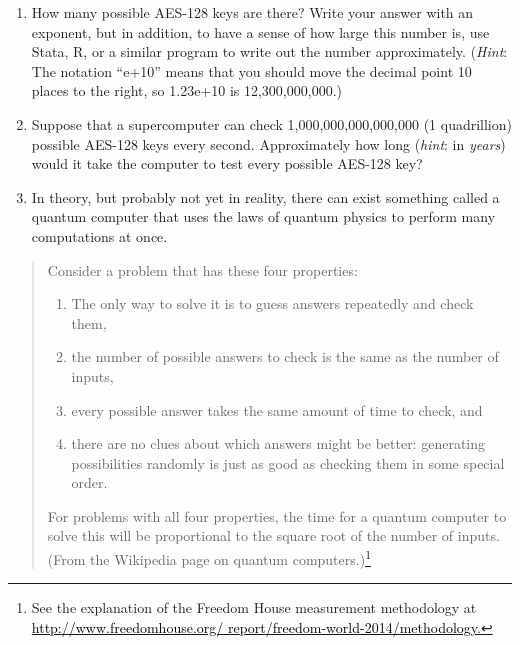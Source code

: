 \begin{enumerate}
\setlength\itemsep{3pt}
\item[(a)] How many possible AES-128 keys are there? Write your answer with an exponent, but in addition, to have a sense of how large this number is, use Stata, R, or a similar program to write out the number approximately. (\textit{Hint}: The notation ``e+10'' means that you should move the decimal point 10 places to the right, so 1.23e+10 is 12,300,000,000.) 
\item[(b)] Suppose that a supercomputer can check 1,000,000,000,000,000 (1 quadril\-lion) possible AES-128 keys every second.  Approximately how long (\textit{hint}: in \textit{years}) would it take the computer to test every possible AES-128 key? 
\item[(c)] In theory, but probably not yet in reality, there can exist something called a quantum computer that uses the laws of quantum physics to perform many computations at once. 
\end{enumerate}

\begin{quotation}
\noindent Consider a problem that has these four properties:
\begin{enumerate}
\item[1.] The only way to solve it is to guess answers repeatedly and check them,
\item[2.] the number of possible answers to check is the same as the number of inputs,
\item[3.] every possible answer takes the same amount of time to check, and
\item[4.] there are no clues about which answers might be better: generating possibilities randomly is just as good as checking them in some special order.
\end{enumerate}\vspace{3pt}
For problems with all four properties, the time for a quantum computer to solve this will be proportional to the square root of the number of inputs. (From the Wikipedia page on quantum computers.)\footnote{See the explanation of the Freedom House measurement methodology at \href{http://www.freedomhouse.org/ report/freedom-world-2014/methodology}{\textcolor{black}{http://www.freedomhouse.org/ report/freedom-world-2014/methodology}.}}
\end{quotation}


